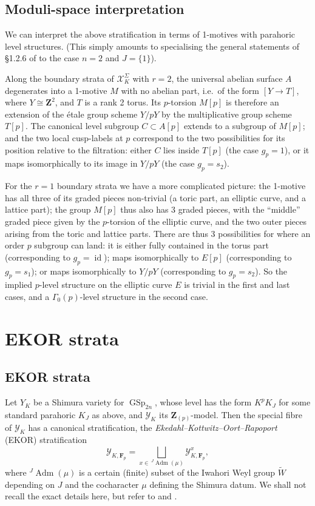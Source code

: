 \documentclass[cjm]{ipart}
\theoremstyle{plain}
\theoremstyle{remark}
\DeclareMathOperator{\GSp}{GSp}
\DeclareMathOperator{\id}{id}
\newcommand{\Fp}{\mathbf{F}_p}
\newcommand{\ZZ}{\mathbf{Z}}
\newcommand{\cX}{\mathcal{X}}
\newcommand{\cY}{\mathcal{Y}}
\numberwithin{equation}{subsection}
\begin{document}
 \subsection{Moduli-space interpretation}

  We can interpret the above stratification in terms of 1-motives with parahoric level structures. (This simply amounts to specialising the general statements of \S 1.2.6 of \cite{stroh10-siegel} to the case $n = 2$ and $J = \{1\}$).

  Along the boundary strata of $\cX_K^{\Sigma}$ with $r = 2$, the universal abelian surface $A$ degenerates into a 1-motive $M$ with no abelian part, i.e.~of the form $[Y \to T]$, where $Y \cong \ZZ^2$, and $T$ is a rank 2 torus. Its $p$-torsion $M[p]$ is therefore an extension of the \'etale group scheme $Y / pY$ by the multiplicative group scheme $T[p]$. The canonical level subgroup $C \subset A[p]$ extends to a subgroup of $M[p]$; and the two local cusp-labels at $p$ correspond to the two possibilities for its position relative to the filtration: either $C$ lies inside $T[p]$ (the case $g_p = 1$), or it maps isomorphically to its image in $Y / pY$ (the case $g_p = s_2$).

  For the $r = 1$ boundary strata we have a more complicated picture: the 1-motive has all three of its graded pieces non-trivial (a toric part, an elliptic curve, and a lattice part); the group $M[p]$ thus also has 3 graded pieces, with the ``middle'' graded piece given by the $p$-torsion of the elliptic curve, and the two outer pieces arising from the toric and lattice parts. There are thus 3 possibilities for where an order $p$ subgroup can land: it is either fully contained in the torus part (corresponding to $g_p = \id$); maps isomorphically to $E[p]$ (corresponding to $g_p = s_1$); or maps isomorphically to $Y / pY$ (corresponding to $g_p = s_2$). So the implied $p$-level structure on the elliptic curve $E$ is trivial in the first and last cases, and a $\Gamma_0(p)$-level structure in the second case.

\section{EKOR strata}

 \subsection{EKOR strata}

  Let $Y_K$ be a Shimura variety for $\GSp_{2n}$, whose level has the form $K^p K_J$ for some standard parahoric $K_J$ as above, and $\cY_K$ its $\ZZ_{(p)}$-model. Then the special fibre of $\cY_K$ has a canonical stratification, the \emph{Ekedahl--Kottwitz--Oort--Rapoport} (EKOR) stratification
  \[ \cY_{K, \Fp} = \bigsqcup_{x \in\, {}^J\!\operatorname{Adm}(\mu)} \cY_{K, \Fp}^x, \]
  where ${}^J\!\! \operatorname{Adm}(\mu)$ is a certain (finite) subset of the Iwahori Weyl group $\widetilde{W}$ depending on $J$ and the cocharacter $\mu$ defining the Shimura datum. We shall not recall the exact details here, but refer to \cite{herapoport17} and \cite{shenyuzhang21}.
\end{document}
